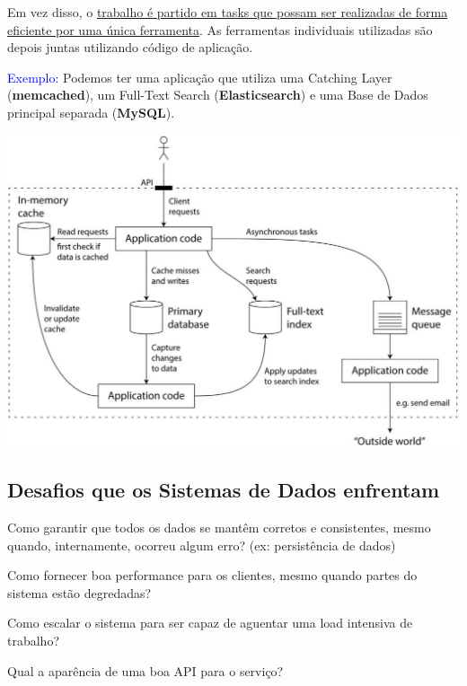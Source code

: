 \documentclass{article}
\begin{document}
\begin{flushleft}
  \vspace{2mm}

  Em vez disso, o \uline{trabalho é partido em tasks que possam ser realizadas de forma eficiente
  por uma única ferramenta}. As ferramentas individuais utilizadas são depois juntas utilizando
  código de aplicação.

  \vspace{2mm}

  \textcolor{Blue}{Exemplo:} Podemos ter uma aplicação que utiliza uma Catching Layer (\textbf{memcached}), um Full-Text Search (\textbf{Elasticsearch})
  e uma Base de Dados principal separada (\textbf{MySQL}).
\end{flushleft}

\begin{center}
  \includegraphics[scale=0.3]{1.png}
\end{center}

\subsection{Desafios que os Sistemas de Dados enfrentam}

\begin{flushleft}
  \item Como garantir que todos os dados se mantêm corretos e consistentes, mesmo quando, internamente, ocorreu algum erro? (ex: persistência de dados)
  \item Como fornecer boa performance para os clientes, mesmo quando partes do sistema estão degredadas?
  \item Como escalar o sistema para ser capaz de aguentar uma load intensiva de trabalho?
  \item Qual a aparência de uma boa API para o serviço?
\end{flushleft}
\end{document}
